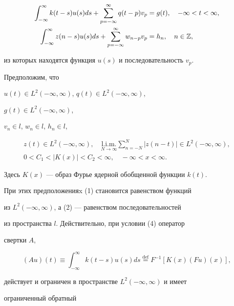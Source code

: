 \begin{align} 


\int^\infty_{-\infty}k(t-s)u(s)ds+ 


\sum^\infty_{p=-\infty}q(t-p)v_p&=g(t),\quad 


-\infty<t<\infty, \\ 


\int^\infty_{-\infty}z(n-s)u(s)ds+ 


\sum^\infty_{p=-\infty}w_{n-p}v_p&=h_n,\quad n\in\Bbb Z, 


\end{align} 


из которых находятся функция $u(s)$ и последовательность $v_p$. 


 


Предположим, что 


$u(t)\in L^2(-\infty,\infty)$, $q(t)\in L^2(-\infty,\infty)$, 


$g(t)\in L^2(-\infty,\infty)$,


$v_n\in l$, $w_n\in l$, $h_n\in l$,


\begin{gather} 


z(t)\in L^2(-\infty,\infty),\quad 


\underset{N\to\infty}{\text{l.i.m.}}{}\sum^N_{n=-N}|z(n-t)| 


\in L^2(-\infty,\infty),\\ 


0<C_1<|K(x)|<C_2<\infty,\quad -\infty<x<\infty. 


\end{gather} 


Здесь $K(x)$ --- образ Фурье ядерной обобщенной функции $k(t)$. 


При этих предположенияx (1) становится равенством функций 


из $L^2(-\infty,\infty)$, а (2) --- равенством последовательностей 


из пространства $l$. Действительно, при условии (4) оператор  


свертки $A$, 


$$ 


(A u)(t)\equiv\int^\infty_{-\infty}k(t-s)u(s)ds


\overset{\text{def}}{=}{}F^{-1}[K(x)(F u)(x)], 


$$ 


действует и ограничен в пространстве $L^2(-\infty,\infty)$ и имеет 


ограниченный обратный 


